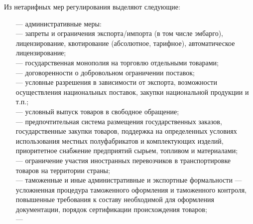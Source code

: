 Из нетарифных мер регулирования выделяют следующие:
\begin{enumerate}
	\item [---] административные меры:\\
	--- запреты и ограничения экспорта/импорта (в том числе эмбарго), лицензирование, квотирование (абсолютное, тарифное), автоматическое лицензирование;\\
	--- государственная монополия на торговлю отдельными товарами;\\
	--- договоренности о добровольном ограничении поставок;\\
	--- условные разрешения в зависимости от экспорта, возможности осуществления национальных поставок, закупки национальной продукции и т.п.;\\
	--- условный выпуск товаров  в свободное обращение;\\
	--- предпочтительная система размещения государственных заказов, государственные закупки товаров, поддержка на определенных условиях использования местных полуфабрикатов и комплектующих изделий, приоритетное снабжение предприятий сырьем, топливом и материалами;\\
	--- ограничение участия иностранных перевозчиков в транспортировке товаров на территории страны;\\
	--- таможенные и иные административные и экспортные формальности --- усложненная процедура таможенного оформления и таможенного контроля, повышенные требования к составу необходимой для оформления документации, порядок сертификации происхождения товаров;\\
	--- 
\end{enumerate}








